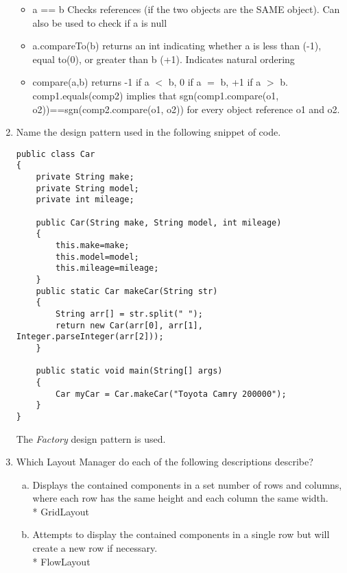 \documentclass[11pt]{article}
\newenvironment{answer}{\large\lstset{basicstyle=\large}\color{white}}{}
\newenvironment{answer}{\large\lstset{basicstyle=\large}\color{red}}{}
\begin{document}
\begin{enumerate}
\begin{answer}
\begin{itemize}
    \item a == b  Checks references (if the two objects are the SAME object).
    Can also be used to check if a is null  

    \item a.compareTo(b) returns an int indicating whether a is less than (-1),
    equal to(0), or greater than b (+1). Indicates natural ordering 

    \item compare(a,b) returns -1 if a $<$ b, 0 if a $=$ b, +1 if a $>$ b.
    comp1.equals(comp2) implies that sgn(comp1.compare(o1,
    o2))==sgn(comp2.compare(o1, o2)) for every object reference o1 and o2.

    \end{itemize}
\end{answer}

\item Name the design pattern used in the following snippet of code.
\begin{lstlisting}
public class Car
{
	private String make;
	private String model;
	private int mileage;

	public Car(String make, String model, int mileage)
	{
		this.make=make;
		this.model=model;
		this.mileage=mileage;
	}
	public static Car makeCar(String str)
	{
		String arr[] = str.split(" ");
		return new Car(arr[0], arr[1], Integer.parseInteger(arr[2]));
	}

	public static void main(String[] args)
	{
		Car myCar = Car.makeCar("Toyota Camry 200000");
	}
}
\end{lstlisting}

\begin{answer}
The \emph{Factory} design pattern is used.
\vspace{.5in}
\end{answer}

\item Which Layout Manager do each of the following descriptions describe?
\begin{enumerate}[(a)]

\item Displays the contained components in a set number of rows and columns,
where each row has the same height and each column the same width.\\*
\begin{answer}
GridLayout
\vspace{.5in}
\end{answer}

\item Attempts to display the contained components in a single row but will
create a new row if necessary.\\*
\begin{answer}
FlowLayout
\vspace{.5in}
\end{answer}


\end{enumerate}
\end{enumerate}
\end{document}
